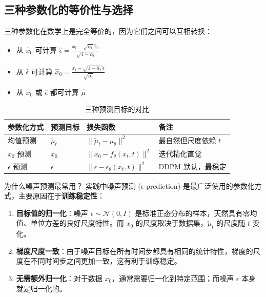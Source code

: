 \subsection{三种参数化的等价性与选择}

三种参数化在数学上是完全等价的，因为它们之间可以互相转换：

\begin{itemize}
    \item 从 $\hat{x}_0$ 可计算 $\hat{\epsilon} = \frac{x_t - \sqrt{\bar{\alpha}_t}\, \hat{x}_0}{\sqrt{1-\bar{\alpha}_t}}$
    \item 从 $\hat{\epsilon}$ 可计算 $\hat{x}_0 = \frac{x_t - \sqrt{1-\bar{\alpha}_t}\, \hat{\epsilon}}{\sqrt{\bar{\alpha}_t}}$
    \item 从 $\hat{x}_0$ 或 $\hat{\epsilon}$ 都可计算 $\hat{\mu}$
\end{itemize}

\begin{table}[H]
\centering
\caption{三种预测目标的对比}
\begin{tabular}{llll}
\toprule
\textbf{参数化方式} & \textbf{预测目标} & \textbf{损失函数} & \textbf{备注} \\
\midrule
均值预测 & $\tilde{\mu}_t$ & $\|\tilde{\mu}_t - \mu_\theta\|^2$ & 最自然但尺度依赖 $t$ \\
$x_0$ 预测 & $x_0$ & $\|x_0 - f_\theta(x_t,t)\|^2$ & 迭代精化直觉 \\
$\epsilon$ 预测 & $\epsilon$ & $\|\epsilon - \epsilon_\theta(x_t,t)\|^2$ & DDPM 默认，最稳定 \\
\bottomrule
\end{tabular}
\end{table}

\begin{importantbox}{为什么噪声预测最常用？}
实践中噪声预测 ($\epsilon$-prediction) 是最广泛使用的参数化方式，主要原因在于\textbf{训练稳定性}：
\begin{enumerate}
    \item \textbf{目标值的归一化}：噪声 $\epsilon \sim \mathcal{N}(0,I)$ 是标准正态分布的样本，天然具有零均值、单位方差的良好尺度特性。而 $x_0$ 的尺度取决于数据集，$\tilde{\mu}_t$ 的尺度随 $t$ 变化。
    \item \textbf{梯度尺度一致}：由于噪声目标在所有时间步都具有相同的统计特性，梯度的尺度在不同时间步之间更加一致，这有利于训练稳定。
    \item \textbf{无需额外归一化}：对于数据 $x_0$，通常需要归一化到特定范围；而噪声 $\epsilon$ 本身就是归一化的。
\end{enumerate}
\end{importantbox}

